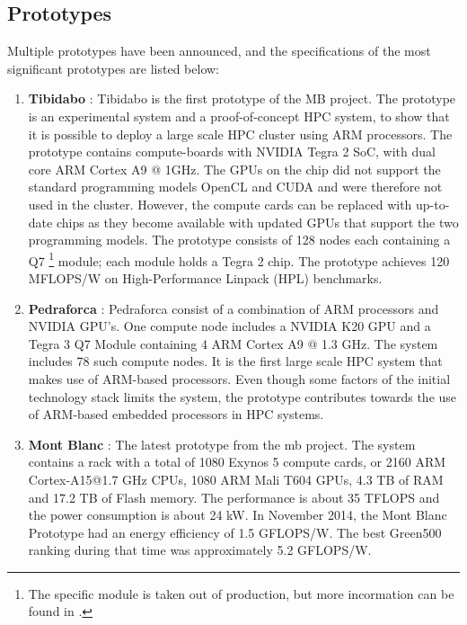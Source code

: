 \subsection{Prototypes}
Multiple prototypes have been announced, and the specifications of the most significant prototypes are listed below:
\begin{enumerate}
\item \textbf{Tibidabo} \cite{a:MB:Tib}: Tibidabo is the first prototype of the MB project. The prototype is an experimental system and a proof-of-concept HPC system, to show that it is possible to deploy a large scale HPC cluster using ARM processors. The prototype contains compute-boards with NVIDIA Tegra 2 SoC, with dual core ARM Cortex A9 @ 1GHz. The GPUs on the chip did not support the standard programming models OpenCL and CUDA and were therefore not used in the cluster. However, the compute cards can be replaced with up-to-date chips as they become available with updated GPUs that support the two programming models. The prototype consists of 128 nodes each containing a Q7 \footnote{The specific module is taken out of production, but more incormation can be found in \cite{a:MB:Tib}.} module; each module holds a Tegra 2 chip. The prototype achieves 120 MFLOPS/W on High-Performance Linpack (HPL) benchmarks.
\item \textbf{Pedraforca} \cite{p:MB:Pedr}: Pedraforca consist of a combination of ARM processors and NVIDIA GPU’s. One compute node includes a NVIDIA K20 GPU and a Tegra 3 Q7 Module containing 4 ARM Cortex A9 @ 1.3 GHz. The system includes 78 such compute nodes. It is the first large scale HPC system that makes use of ARM-based processors. Even though some factors of the initial technology stack limits the system, the prototype contributes towards the use of ARM-based embedded processors in HPC systems.
\item \textbf{Mont Blanc} \cite{p:MB:MB-prot, p:MB-15}: The latest prototype from the \gls{mb} project. The system contains a rack with a total of 1080 Exynos 5 compute cards, or 2160 ARM Cortex-A15@1.7 GHz CPUs, 1080 ARM Mali T604 GPUs, 4.3 TB of RAM and 17.2 TB of Flash memory. The performance is about 35 TFLOPS and the power consumption is about 24 kW. In November 2014, the Mont Blanc Prototype had an energy efficiency of 1.5 GFLOPS/W. The best Green500 ranking during that time was approximately 5.2 GFLOPS/W.
\end{enumerate}

\clearpage
